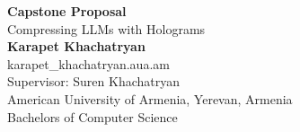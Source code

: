 \documentclass{article}
\begin{document}
	\begin{center}
    
    
		\LARGE{\textbf{Capstone Proposal}} \\
        \vspace{1em}
        \Large{Compressing LLMs with Holograms} \\
        \vspace{1em}
        \normalsize\textbf{Karapet Khachatryan} \\
        \normalsize{karapet\_khachatryan\@edu.aua.am} \\ %
        \vspace{1em}
        \normalsize{Supervisor: Suren Khachatryan} \\
        \vspace{1em}
        \normalsize{American University of Armenia, Yerevan, Armenia} \\
        \normalsize{Bachelors of Computer Science}
    
	\end{center}
\end{document}
